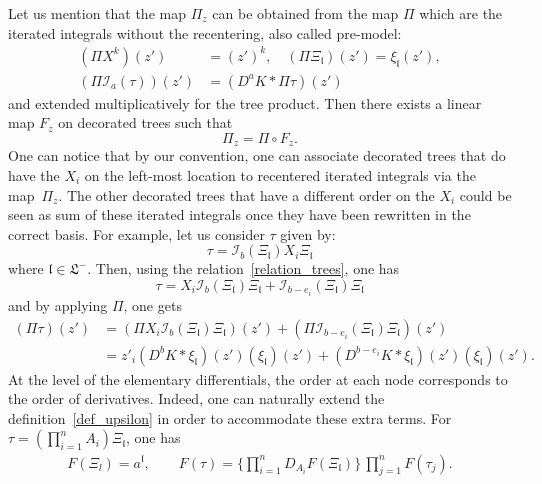 \documentclass[AHL,Unicode,longabstracts]{cedram}
\newcommand*\I{\mathcal{I}}
\newcommand*\CI{\I}
\newcommand{\mfl}{\mathfrak{l}}
\newcommand*\Lab{\mathfrak{L}}
\begin{document}
Let us mention that the map $ \Pi_z $ can be obtained from the map $ \Pi $ which are the iterated integrals without the recentering, also called pre-model:
\begin{equation}\label{def_Pi_z}
\begin{aligned}
(\Pi X^k)(z') & = (z')^k, \quad (\Pi \Xi_{\mfl})(z') = \xi_{\mfl}(z'),
\\ (\Pi \CI_{a}(\tau))(z') & = (D^{a} K * \Pi \tau)(z')
\end{aligned}
\end{equation}
and extended multiplicatively for the tree product. Then there exists a linear map $F_z$ on decorated trees such that
\begin{equation*}
\Pi_z = \Pi \circ F_z.
\end{equation*}
One can notice that by our convention, one can associate decorated trees that do have the $X_i$ on the left-most location to recentered iterated integrals via the map~$\Pi_z$. The other decorated trees that have a different order on the $X_i$ could be seen as sum of these iterated integrals once they have been rewritten in the correct basis. For example, let us consider $ \tau $ given by:
\begin{equation}\label{example_1}
\tau = \CI_{b}(\Xi_{\mfl}) X_i \Xi_{\mfl}
\end{equation}
where $\mfl \in \Lab^-$. Then, using the relation~\eqref{relation_trees}, one has
\begin{equation*}
\tau = X_i \CI_{b}(\Xi_{\mfl}) \Xi_{\mfl} + \CI_{b-e_i}(\Xi_{\mfl}) \Xi_{\mfl}
\end{equation*}
and by applying $\Pi$, one gets
\begin{equation*}
\begin{aligned}
(\Pi \tau)(z') & = (\Pi X_i \CI_{b}(\Xi_{\mfl}) \Xi_{\mfl})(z') + (\Pi \CI_{b-e_i}(\Xi_{\mfl}) \Xi_{\mfl})(z')
\\ & = z'_i (D^{b} K * \xi_{\mfl})(z') (\xi_{\mfl})(z') + (D^{b-e_i} K * \xi_{\mfl})(z') (\xi_{\mfl})(z').
\end{aligned}
\end{equation*}
At the level of the elementary differentials, the order at each node corresponds to the order of derivatives. Indeed, one can naturally extend the definition~\eqref{def_upsilon} in order to accommodate these extra terms. For $\tau = (\prod_{i=1}^n A_i) \Xi_{\mfl}$, one has
\begin{equation}\label{def_upsilon_general}
\begin{aligned}
F(\Xi_l) = a^{\mfl}, \qquad F(\tau) = \Big\{\prod_{i=1}^n D_{A_i} F (\Xi_{\mfl})\Big\}\,\prod_{j=1}^n F(\tau_j).
\end{aligned}
\end{equation}
\end{document}
